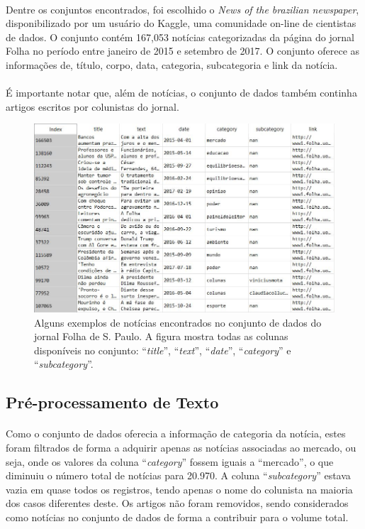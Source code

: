 \documentclass[grad,numbers]{coppe}
\begin{document}
	  	\paragraph{}Dentre os conjuntos encontrados, foi escolhido o \textit{News of the brazilian newspaper}\cite{folha-news-dataset}, disponibilizado por um usuário do Kaggle, uma comunidade on-line de cientistas de dados. O conjunto contém 167,053 notícias categorizadas da página do jornal Folha no período entre janeiro de 2015 e setembro de 2017. O conjunto oferece as informações de, título, corpo, data, categoria, subcategoria e link da notícia.
	  	\paragraph{}É importante notar que, além de notícias, o conjunto de dados também continha artigos escritos por colunistas do jornal.
	  	\begin{figure}[h]
	  		\includegraphics[width=15cm]{folha-dataset}
	  		\caption{Alguns exemplos de notícias encontrados no conjunto de dados do jornal Folha de S. Paulo. A figura mostra todas as colunas disponíveis no conjunto: ``\textit{title}'', ``\textit{text}'', ``\textit{date}'', ``\textit{category}'' e ``\textit{subcategory}''.}
	  		\label{fig:folha-dataset-fig}
	  	\end{figure}
  		\subsection{Pré-processamento de Texto}
  			\paragraph{}Como o conjunto de dados oferecia a informação de categoria da notícia, estes foram filtrados de forma a adquirir apenas as notícias associadas ao mercado, ou seja, onde os valores da coluna ``\textit{category}'' fossem iguais a ``mercado'', o que diminuiu o número total de notícias para 20.970. A coluna ``\textit{subcategory}'' estava vazia em quase todos os registros, tendo apenas o nome do colunista na maioria dos casos diferentes deste. Os artigos não foram removidos, sendo considerados como notícias no conjunto de dados de forma a contribuir para o volume total.
\end{document}
